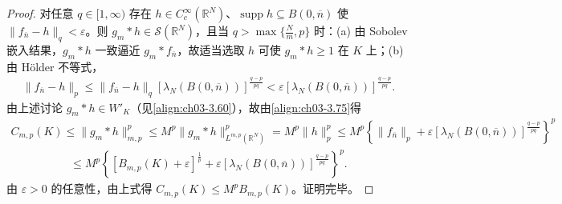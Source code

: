 \documentclass[../../main.tex]{subfiles}%
\begin{document}
\begin{proof}
对任意 $q\in[1,\infty)$ 存在 $h\in C^\infty_c(\mathbb{R}^N)$、$\operatorname{supp}h\subseteq B(0,\overline n)$ 使 $\|f_{\overline n}-h\|_q<\varepsilon$。则 $g_m*h\in\mathcal{S}(\mathbb{R}^N)$，且当 $q>\max\{\frac Nm,p\}$ 时：(a) 由 Sobolev 嵌入结果，$g_m*h$ 一致逼近 $g_m*f_{\overline n}$，故适当选取 $h$ 可使 $g_m*h\geqslant1$ 在 $K$ 上；(b) 由 Hölder 不等式，
\begin{align}
\|f_{\overline n}-h\|_p\leqslant\|f_{\overline n}-h\|_q[\lambda_N(B(0,\overline n))]^{\frac{q-p}{pq}}
<\varepsilon[\lambda_N(B(0,\overline n))]^{\frac{q-p}{pq}}.\label{align:ch03-3.75}
\end{align}
由上述讨论 $g_m*h\in W'_K$（见\eqref{align:ch03-3.60}），故由\eqref{align:ch03-3.75}得
\begin{align*}
C_{m,p}(K)\leqslant\|g_m*h\|_{m,p}^p\leqslant M^p\|g_m*h\|_{L^{m,p}(\mathbb{R}^N)}^p=M^p\|h\|_p^p
\leqslant M^p\left\{\|f_{\overline n}\|_p+\varepsilon[\lambda_N(B(0,\overline n))]^{\frac{q-p}{pq}}\right\}^p
\end{align*}
\begin{align*}
\leqslant M^p\left\{[B_{m,p}(K)+\varepsilon]^{\frac1p}+\varepsilon[\lambda_N(B(0,\overline n))]^{\frac{q-p}{pq}}\right\}^p.
\end{align*}
由 $\varepsilon>0$ 的任意性，由上式得 $C_{m,p}(K)\leqslant M^pB_{m,p}(K)$。证明完毕。
\end{proof}
\end{document}
